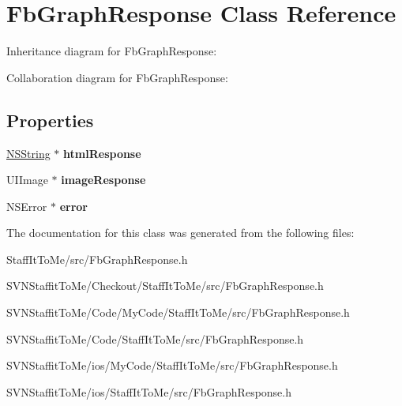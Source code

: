 \hypertarget{interface_fb_graph_response}{
\section{\-Fb\-Graph\-Response \-Class \-Reference}
\label{interface_fb_graph_response}
}


\-Inheritance diagram for \-Fb\-Graph\-Response\-:


\-Collaboration diagram for \-Fb\-Graph\-Response\-:
\subsection*{\-Properties}
\begin{DoxyCompactItemize}
\item 
\hypertarget{interface_fb_graph_response_a91b0906689c95c4dd5b0989e01279eaf}{
\hyperlink{class_n_s_string}{\-N\-S\-String} $\ast$ {\bfseries html\-Response}}
\label{interface_fb_graph_response_a91b0906689c95c4dd5b0989e01279eaf}

\item 
\hypertarget{interface_fb_graph_response_aca3707fd75edb216b2fed9a7f58a3bbc}{
\-U\-I\-Image $\ast$ {\bfseries image\-Response}}
\label{interface_fb_graph_response_aca3707fd75edb216b2fed9a7f58a3bbc}

\item 
\hypertarget{interface_fb_graph_response_a4e0aeaceb57564a2c3d127c789934164}{
\-N\-S\-Error $\ast$ {\bfseries error}}
\label{interface_fb_graph_response_a4e0aeaceb57564a2c3d127c789934164}

\end{DoxyCompactItemize}


\-The documentation for this class was generated from the following files\-:\begin{DoxyCompactItemize}
\item 
\-Staff\-It\-To\-Me/src/\-Fb\-Graph\-Response.\-h\item 
\-S\-V\-N\-Staffit\-To\-Me/\-Checkout/\-Staff\-It\-To\-Me/src/\-Fb\-Graph\-Response.\-h\item 
\-S\-V\-N\-Staffit\-To\-Me/\-Code/\-My\-Code/\-Staff\-It\-To\-Me/src/\-Fb\-Graph\-Response.\-h\item 
\-S\-V\-N\-Staffit\-To\-Me/\-Code/\-Staff\-It\-To\-Me/src/\-Fb\-Graph\-Response.\-h\item 
\-S\-V\-N\-Staffit\-To\-Me/ios/\-My\-Code/\-Staff\-It\-To\-Me/src/\-Fb\-Graph\-Response.\-h\item 
\-S\-V\-N\-Staffit\-To\-Me/ios/\-Staff\-It\-To\-Me/src/\-Fb\-Graph\-Response.\-h\end{DoxyCompactItemize}
